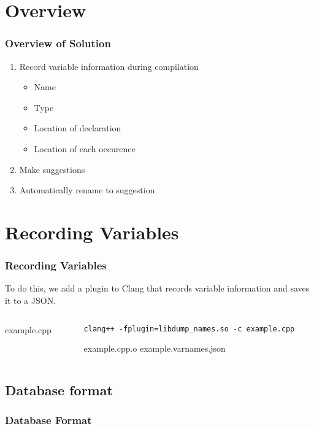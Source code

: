 \documentclass[12pt]{beamer}
\begin{document}
\section{Overview}
\begin{frame}
	\frametitle{Overview of Solution}
	\begin{enumerate}
		\item Record variable information during compilation
		\begin{itemize}
			\item Name
			\item Type
			\item Location of declaration
			\item Location of each occurence
		\end{itemize}
		\item Make suggestions
		\item Automatically rename to suggestion
	\end{enumerate}
\end{frame}
\section{Recording Variables}
\begin{frame}
	\frametitle{Recording Variables}
	To do this, we add a plugin to Clang that records variable information and
	saves it to a JSON.
	\begin{columns}
		\begin{column}{0.50\textwidth}
			
					{example.cpp}
		\end{column}
		\begin{column}{0.35\textwidth}
			\lstset{breaklines=true}
			\lstinline|clang++ -fplugin=libdump_names.so -c example.cpp|
			\lstset{breaklines=false}

			\textrightarrow example.cpp.o
			\textrightarrow example.varnames.json
		\end{column}
	\end{columns}
\end{frame}
\subsection{Database format}
\begin{frame}
	\frametitle{Database Format}
	
\end{frame}
\end{document}
